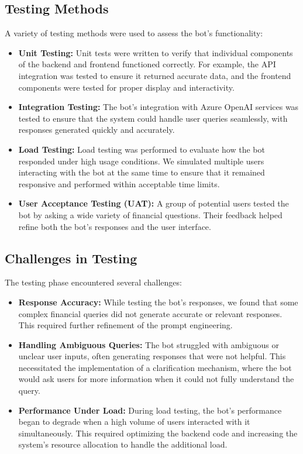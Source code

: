 \documentclass[a4paper,12pt]{report}
\begin{document}
\subsection*{Testing Methods}
A variety of testing methods were used to assess the bot’s functionality:
\begin{itemize}
    \item \textbf{Unit Testing:} Unit tests were written to verify that individual components of the backend and frontend functioned correctly. For example, the API integration was tested to ensure it returned accurate data, and the frontend components were tested for proper display and interactivity.
    \item \textbf{Integration Testing:} The bot’s integration with Azure OpenAI services was tested to ensure that the system could handle user queries seamlessly, with responses generated quickly and accurately.
    \item \textbf{Load Testing:} Load testing was performed to evaluate how the bot responded under high usage conditions. We simulated multiple users interacting with the bot at the same time to ensure that it remained responsive and performed within acceptable time limits.
    \item \textbf{User Acceptance Testing (UAT):} A group of potential users tested the bot by asking a wide variety of financial questions. Their feedback helped refine both the bot's responses and the user interface.
\end{itemize}

\subsection*{Challenges in Testing}
The testing phase encountered several challenges:
\begin{itemize}
    \item \textbf{Response Accuracy:} While testing the bot’s responses, we found that some complex financial queries did not generate accurate or relevant responses. This required further refinement of the prompt engineering.
    \item \textbf{Handling Ambiguous Queries:} The bot struggled with ambiguous or unclear user inputs, often generating responses that were not helpful. This necessitated the implementation of a clarification mechanism, where the bot would ask users for more information when it could not fully understand the query.
    \item \textbf{Performance Under Load:} During load testing, the bot’s performance began to degrade when a high volume of users interacted with it simultaneously. This required optimizing the backend code and increasing the system’s resource allocation to handle the additional load.
\end{itemize}
\end{document}
